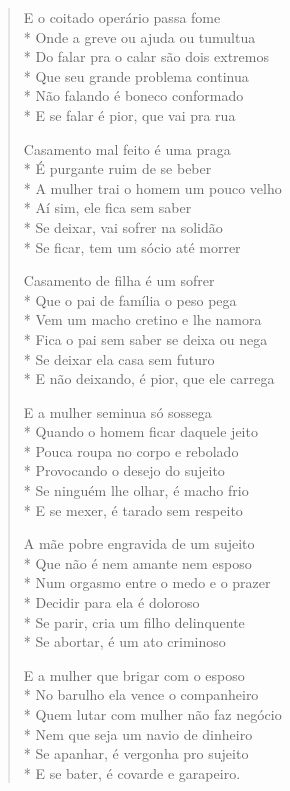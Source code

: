 \begin{verse}
E o coitado operário passa fome\\*
Onde a greve ou ajuda ou tumultua\\*
Do falar pra o calar são dois extremos\\*
Que seu grande problema continua\\*
Não falando é boneco conformado\\*
E se falar é pior, que vai pra rua

Casamento mal feito é uma praga\\*
É purgante ruim de se beber\\*
A mulher trai o homem um pouco velho\\*
Aí sim, ele fica sem saber\\*
Se deixar, vai sofrer na solidão\\*
Se ficar, tem um sócio até morrer

Casamento de filha é um sofrer\\*
Que o pai de família o peso pega\\*
Vem um macho cretino e lhe namora\\*
Fica o pai sem saber se deixa ou nega\\*
Se deixar ela casa sem futuro\\*
E não deixando, é pior, que ele carrega

E a mulher seminua só sossega\\*
Quando o homem ficar daquele jeito\\*
Pouca roupa no corpo e rebolado\\*
Provocando o desejo do sujeito\\*
Se ninguém lhe olhar, é macho frio\\*
E se mexer, é tarado sem respeito

A mãe pobre engravida de um sujeito\\*
Que não é nem amante nem esposo\\*
Num orgasmo entre o medo e o prazer\\*
Decidir para ela é doloroso\\*
Se parir, cria um filho delinquente\\*
Se abortar, é um ato criminoso

E a mulher que brigar com o esposo\\*
No barulho ela vence o companheiro\\*
Quem lutar com mulher não faz negócio\\*
Nem que seja um navio de dinheiro\\*
Se apanhar, é vergonha pro sujeito\\*
E se bater, é covarde e garapeiro.
\end{verse}


